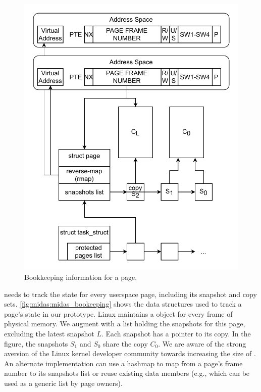 \begin{figure}[]
  \centering
  \includegraphics[width=0.75\linewidth]{media/midas/book-keeping.pdf}
  \caption[\midas{}' bookkeeping information for a page.]
          {Bookkeeping information for a page.}
  \label{fig:midas:midas_bookeeping}
\end{figure}

\midas needs to track the state for every userspace page, including
its snapshot and copy sets.
\autoref{fig:midas:midas_bookeeping} shows the data structures used to
track a page's state in our prototype.
Linux maintains a  object for every frame of
physical memory.
We augment   with a list holding the snapshots
for this page, excluding the latest snapshot $L$.
Each snapshot has a pointer to its copy.
In the figure, the snapshots $S_1$ and $S_0$ share the copy $C_0$.
We are aware of the strong aversion of the
Linux kernel developer community towards increasing the size of
.
An alternate implementation can use a hashmap to
map from a page's frame number to its snapshots list or
reuse existing data members (e.g.,  which
can be used as a generic list by page owners).


